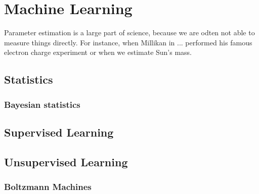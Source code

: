 \chapter{Machine Learning}
Parameter estimation is a large part of science, because we are odten not able to measure things directly. For instance, when Millikan in ... performed his famous electron charge experiment or when we estimate Sun's mass. 
\section{Statistics}
\subsection{Bayesian statistics}
\section{Supervised Learning}
\section{Unsupervised Learning}
\subsection{Boltzmann Machines}